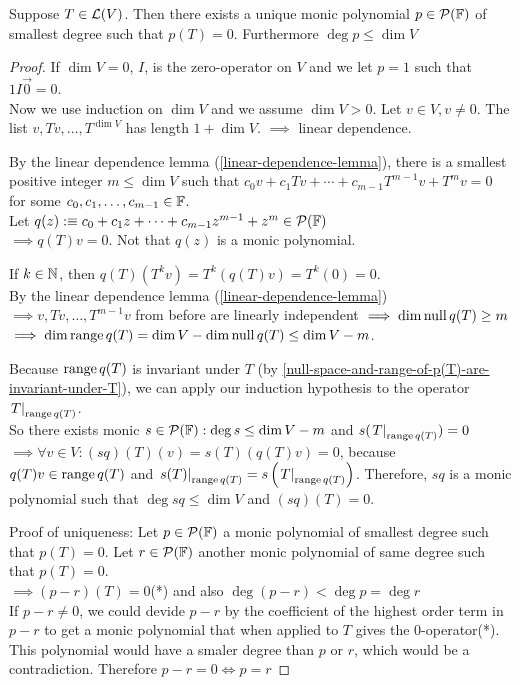 \begin{thm}
    \label{unique-monic-polynomial-of-smallest-degree}
    Suppose $T\in \mathcal{L}(V)$. Then there exists a unique monic polynomial $p\in \mathcal{P}({\mathbb{F}})$ of smallest degree such that $p(T)=0$. Furthermore $\deg p \leq \dim V$
\end{thm}
\begin{proof}
    If $\dim V=0$, $I$, is the zero-operator on $V$ and we let $p=1$ such that $1I\vec0=0$. \\
    Now we use induction on $\dim V$ and we assume $\dim V > 0$. Let $v\in V, v \neq 0$. The list $v, Tv, \dots, T^{\dim V}$ has length $1+\dim V.$
    $\implies$ linear dependence.
    
    By the linear dependence lemma (\ref{linear-dependence-lemma}), there is a smallest positive integer $m\leq \dim V$ such that $c_0 v + c_1 Tv + \cdots + c_{m-1} T^{m-1} v + T^m v = 0$ for some $c_0, c_1, \dots, c_{m-1} \in {\mathbb{F}}$. \\
    
    Let $q(z) :\equiv c_0 + c_1z + \cdots + c_{m-1} z^{m-1} +z^{m} \in \mathcal{P} ({\mathbb{F}})$ \\
    $\implies q(T) v=0$. Not that $q(z)$ is a monic polynomial.
    
    If $k \in \mathbb{N}$, then $q(T)(T^kv)=T^k(q(T)v) =T^k (0) =0$.\\
    By the linear dependence lemma (\ref{linear-dependence-lemma}) $\implies v, Tv, \dots, T^{m-1}v$ from before are linearly independent $\implies \dim \operatorname{null} q(T) \geq m$ \\
    $\implies \dim \operatorname{range} q(T) = \dim V - \dim \operatorname{null} q(T) \leq \dim V - m$.
    
    Because $\operatorname{range} q(T)$ is invariant under $T$ (by \ref{null-space-and-range-of-p(T)-are-invariant-under-T}), we can apply our induction hypothesis to the operator $\left.T\right|_{\operatorname{range} q(T)}$. \\
    So there exists monic $s \in \mathcal{P} ({\mathbb{F}}): \deg s \leq \dim V - m$ and $s(\left.T\right|_{\operatorname{range} q(T)})=0$ \\
    $\implies \forall v \in V: (sq)(T)(v) = s(T) (q(T)v) = 0$, because $q(T)v \in \operatorname{range} q(T)$ and $\left.s(T)\right|_{\operatorname{range} q(T)}=s\left( \left.T\right|_{\operatorname{range} q(T)} \right )$.
    Therefore, $sq$ is a monic polynomial such that $\deg sq \leq \dim V$ and $(sq)(T)=0$.
    
    Proof of uniqueness: Let $p\in \mathcal{P} ({\mathbb{F}})$ a monic polynomial of smallest degree such that $p(T)=0$. Let $r\in \mathcal{P} ( {\mathbb{F}})$ another monic polynomial of same degree such that $p(T)=0$. \\
    $\implies (p-r) (T) = 0$(*) and also $\deg (p-r) < \deg p = \deg r$ \\
    If $p-r \neq 0$, we could devide $p-r$ by the coefficient of the highest order term in $p-r$ to get a monic polynomial that when applied to $T$ gives the $0$-operator(*). This polynomial would have a smaler degree than $p$ or $r$, which would be a contradiction. Therefore $p-r=0 \iff p = r$
\end{proof}

